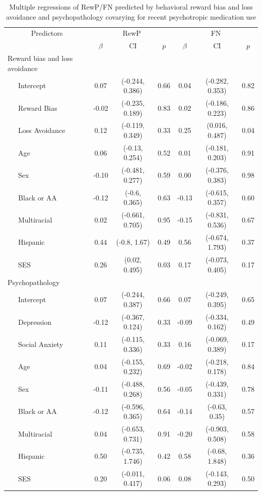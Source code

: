 \documentclass[english,man,floatsintext]{apa6}
\begin{document}
\begin{table}[tbp]

\begin{center}
\begin{threeparttable}

\caption{\label{tab:unnamed-chunk-9}Multiple regressions of RewP/FN predicted by behavioral reward bias and loss avoidance and psychopathology covarying for recent psychotropic medication use}

\begin{tabular}{lcccccc}
\toprule
 \multicolumn{1}{c}{Predictors} & \multicolumn{3}{c}{RewP} & \multicolumn{3}{c}{FN} \\
\cmidrule(r){1-1} \cmidrule(r){2-4} \cmidrule(r){5-7}
  & $\beta$ & CI & $p$ & $\beta$ & CI & $p$\\
\midrule
Reward bias and loss avoidance &  &  &  &  &  & \\
\ \ \ Intercept & 0.07 & (-0.244, 0.386) & 0.66 & 0.04 & (-0.282, 0.353) & 0.82\\
\ \ \ Reward Bias & -0.02 & (-0.235, 0.189) & 0.83 & 0.02 & (-0.186, 0.223) & 0.86\\
\ \ \ Loss Avoidance & 0.12 & (-0.119, 0.349) & 0.33 & 0.25 & (0.016, 0.487) & 0.04\\
\ \ \ Age & 0.06 & (-0.13, 0.254) & 0.52 & 0.01 & (-0.181, 0.203) & 0.91\\
\ \ \ Sex & -0.10 & (-0.481, 0.277) & 0.59 & 0.00 & (-0.376, 0.383) & 0.98\\
\ \ \ Black or AA & -0.12 & (-0.6, 0.365) & 0.63 & -0.13 & (-0.615, 0.357) & 0.60\\
\ \ \ Multiracial & 0.02 & (-0.661, 0.705) & 0.95 & -0.15 & (-0.831, 0.536) & 0.67\\
\ \ \ Hispanic & 0.44 & (-0.8, 1.67) & 0.49 & 0.56 & (-0.674, 1.793) & 0.37\\
\ \ \ SES & 0.26 & (0.02, 0.495) & 0.03 & 0.17 & (-0.073, 0.405) & 0.17\\
Psychopathology &  &  &  &  &  & \\
\ \ \ Intercept & 0.07 & (-0.244, 0.387) & 0.66 & 0.07 & (-0.249, 0.395) & 0.65\\
\ \ \ Depression & -0.12 & (-0.367, 0.124) & 0.33 & -0.09 & (-0.334, 0.162) & 0.49\\
\ \ \ Social Anxiety & 0.11 & (-0.115, 0.336) & 0.33 & 0.16 & (-0.069, 0.389) & 0.17\\
\ \ \ Age & 0.04 & (-0.155, 0.232) & 0.69 & -0.02 & (-0.218, 0.178) & 0.84\\
\ \ \ Sex & -0.11 & (-0.488, 0.268) & 0.56 & -0.05 & (-0.439, 0.331) & 0.78\\
\ \ \ Black or AA & -0.12 & (-0.596, 0.365) & 0.64 & -0.14 & (-0.63, 0.35) & 0.57\\
\ \ \ Multiracial & 0.04 & (-0.653, 0.731) & 0.91 & -0.20 & (-0.903, 0.508) & 0.58\\
\ \ \ Hispanic & 0.50 & (-0.735, 1.746) & 0.42 & 0.58 & (-0.68, 1.848) & 0.36\\
\ \ \ SES & 0.20 & (-0.011, 0.417) & 0.06 & 0.08 & (-0.143, 0.293) & 0.50\\
\bottomrule
\end{tabular}


\end{threeparttable}
\end{center}
\end{table}
\end{document}
